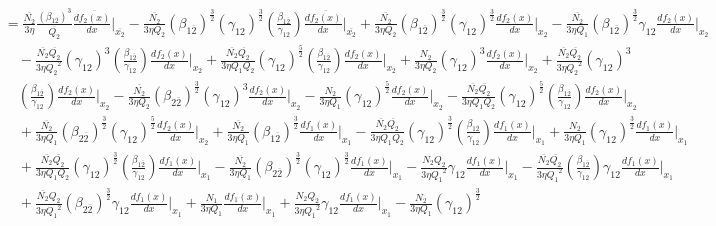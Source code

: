 \documentclass[fleqn, 10pt]{article}
\begin{document}
            \begin{equation*}
            \begin{split}
            &=   \frac{\overline{N_2}}{3 \eta} \frac{(\beta_{1\overline{2}})^3}{\overline{Q_2}} \frac{d\overline{f_2(x)}}{dx} \Bigg|_{\overline{x_2}} -   \frac{\overline{N_2}}{3 \eta Q_2} (\beta_{1\overline{2}})^\frac{3}{2} (\gamma_{12})^\frac{3}{2} \left(\frac{\beta_{1\overline{2}}}{\gamma_{12}}\right) \frac{d\overline{f_2(x)}}{dx} \Bigg|_{\overline{x_2}} +   \frac{\overline{N_2}}{3 \eta Q_2} (\beta_{1\overline{2}})^\frac{3}{2} (\gamma_{12})^\frac{3}{2} \frac{df_2(x)}{dx} \Bigg|_{x_2} -   \frac{\overline{N_2}}{3 \eta Q_1} (\beta_{1\overline{2}})^\frac{3}{2} \gamma_{12} \frac{df_2(x)}{dx} \Bigg|_{x_2} \\ & \quad -   \frac{\overline{N_2} \overline{Q_2}}{3 \eta {Q_2}^2} (\gamma_{12})^3 \left(\frac{\beta_{1\overline{2}}}{\gamma_{12}}\right) \frac{df_2(x)}{dx} \Bigg|_{x_2} +   \frac{\overline{N_2} \overline{Q_2}}{3 \eta Q_1 Q_2} (\gamma_{12})^\frac{5}{2}  \left(\frac{\beta_{1\overline{2}}}{\gamma_{12}}\right) \frac{df_2(x)}{dx} \Bigg|_{x_2} +   \frac{N_2}{3 \eta Q_2} (\gamma_{12})^3 \frac{df_2(x)}{dx} \Bigg|_{x_2} +  \frac{\overline{N_2} \overline{Q_2}}{3 \eta {Q_2}^2} (\gamma_{12})^3  \\ & \quad   \left(\frac{\beta_{1\overline{2}}}{\gamma_{12}}\right) \frac{df_2(x)}{dx} \Bigg|_{x_2}  -   \frac{\overline{N_2}}{3 \eta Q_2} (\beta_{2\overline{2}})^\frac{3}{2} (\gamma_{12})^3 \frac{df_2(x)}{dx} \Bigg|_{x_2} -   \frac{N_2}{3 \eta Q_1} (\gamma_{12})^\frac{5}{2} \frac{df_2(x)}{dx} \Bigg|_{x_2} -   \frac{\overline{N_2} \overline{Q_2}}{3 \eta Q_1 Q_2} (\gamma_{12})^\frac{5}{2}  \left(\frac{\beta_{1\overline{2}}}{\gamma_{12}}\right) \frac{df_2(x)}{dx} \Bigg|_{x_2}  \\ & \quad +   \frac{\overline{N_2}}{3 \eta Q_1} (\beta_{2\overline{2}})^\frac{3}{2} (\gamma_{12})^\frac{5}{2} \frac{df_2(x)}{dx} \Bigg|_{x_2} +   \frac{\overline{N_2}}{3 \eta Q_1} (\beta_{1\overline{2}})^\frac{3}{2} \frac{df_1(x)}{dx} \Bigg|_{x_1} -   \frac{\overline{N_2} \overline{Q_2}}{3 \eta Q_1 Q_2} (\gamma_{12})^\frac{3}{2}  \left(\frac{\beta_{1\overline{2}}}{\gamma_{12}}\right) \frac{df_1(x)}{dx} \Bigg|_{x_1} +   \frac{N_2}{3 \eta Q_1} (\gamma_{12})^\frac{3}{2} \frac{df_1(x)}{dx} \Bigg|_{x_1}  \\ & \quad +   \frac{\overline{N_2} \overline{Q_2}}{3 \eta Q_1 Q_2} (\gamma_{12})^\frac{3}{2}  \left(\frac{\beta_{1\overline{2}}}{\gamma_{12}}\right) \frac{df_1(x)}{dx} \Bigg|_{x_1} -   \frac{\overline{N_2}}{3 \eta Q_1} (\beta_{2\overline{2}})^\frac{3}{2} (\gamma_{12})^\frac{3}{2} \frac{df_1(x)}{dx} \Bigg|_{x_1} -   \frac{N_2 Q_2}{3 \eta {Q_1}^2} \gamma_{12} \frac{df_1(x)}{dx} \Bigg|_{x_1} -   \frac{\overline{N_2} \overline{Q_2}}{3 \eta {Q_1}^2}  \left(\frac{\beta_{1\overline{2}}}{\gamma_{12}}\right) \gamma_{12} \frac{df_1(x)}{dx} \Bigg|_{x_1} \\ & \quad +   \frac{\overline{N_2} Q_2}{3 \eta {Q_1}^2} (\beta_{2\overline{2}})^\frac{3}{2} \gamma_{12} \frac{df_1(x)}{dx} \Bigg|_{x_1}  +   \frac{N_1}{3 \eta Q_1} \frac{df_1(x)}{dx} \Bigg|_{x_1} +   \frac{N_2 Q_2}{3 \eta {Q_1}^2} \gamma_{12} \frac{df_1(x)}{dx} \Bigg|_{x_1} -   \frac{N_2}{3 \eta Q_1} (\gamma_{12})^\frac{3}{2} 
\end{split}
\end{equation*}
\end{document}
